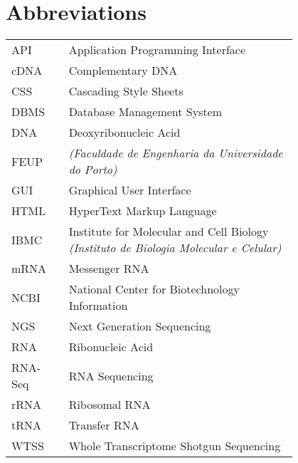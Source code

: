 \chapter*{Abbreviations}

\begin{flushleft}
\begin{tabular}{l p{0.8\linewidth}}
API       & Application Programming Interface\\
cDNA      & Complementary DNA\\
CSS       & Cascading Style Sheets\\
DBMS      & Database Management System\\
DNA       & Deoxyribonucleic Acid\\
FEUP      & \Feup{} \textit{(Faculdade de Engenharia da Universidade do Porto)}\\
GUI       & Graphical User Interface\\
HTML      & HyperText Markup Language\\
IBMC      & Institute for Molecular and Cell Biology \textit{(Instituto de Biologia Molecular e Celular)}\\
mRNA      & Messenger RNA\\
NCBI      & National Center for Biotechnology Information\\
NGS       & Next Generation Sequencing\\
RNA       & Ribonucleic Acid\\
RNA-Seq   & RNA Sequencing\\
rRNA      & Ribosomal RNA\\
tRNA      & Transfer RNA\\
WTSS      & Whole Transcriptome Shotgun Sequencing\\
\end{tabular}
\end{flushleft}

